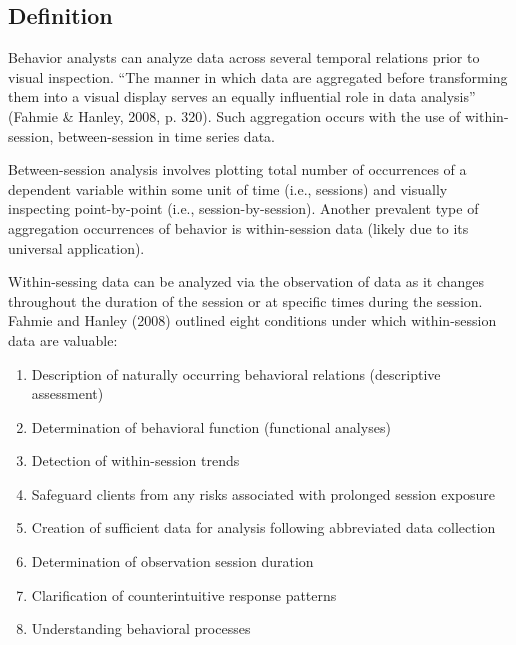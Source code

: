 \subsection{Definition}
Behavior analysts can analyze data across several temporal relations prior to visual inspection. ``The manner in which data are aggregated before transforming them into a visual display serves an equally influential role in data analysis'' (Fahmie \& Hanley, 2008, p. 320).  Such aggregation occurs with the use of within-session, between-session in time series data. 

Between-session analysis involves plotting total number of occurrences of a dependent variable within some unit of time (i.e., sessions) and visually inspecting point-by-point (i.e., session-by-session). Another prevalent type of aggregation occurrences of behavior is within-session data (likely due to its universal application). 

Within-sessing data can be analyzed via the observation of data as it changes throughout the duration of the session or at specific times during the session. Fahmie and Hanley (2008) outlined eight conditions under which within-session data are valuable:
\begin{enumerate}
\item Description of naturally occurring behavioral relations (descriptive assessment) 
\item Determination of behavioral function (functional analyses)
\item Detection of within-session trends
\item Safeguard clients from any risks associated with prolonged session exposure
\item Creation of sufficient data for analysis following abbreviated data collection
\item Determination of observation session duration
\item Clarification of counterintuitive response patterns
\item Understanding behavioral processes
\end{enumerate}

